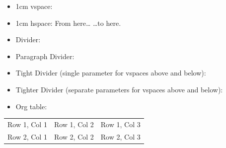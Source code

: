 \documentclass[10pt,letterpaper,ragged2e,withhyper]{altacv}
\begin{document}
\label{sec:orgaa14d8a}
\begin{itemize}
\item 1cm vspace:
\end{itemize}

\vspace{1cm}

\begin{itemize}
\item 1cm hspace: From here\ldots{} \hspace{1cm} \ldots{}to here.
\end{itemize}


\label{sec:orgd29cf89}
\begin{itemize}
\item Divider:
\end{itemize}
\divider

\begin{itemize}
\item Paragraph Divider:
\end{itemize}
\par\divider

\begin{itemize}
\item Tight Divider (single parameter for vspaces above and below):
\end{itemize}
\vspace{-1ex}\divider\vspace{-1ex}

\begin{itemize}
\item Tighter Divider (separate parameters for vspaces above and below):
\end{itemize}
\vspace{-2ex}\divider\vspace{1ex}


\label{sec:orga0a6f56}
\begin{itemize}
\item Org table:
\end{itemize}

\begin{center}
\begin{tabular}{lll}
\hline
Row 1, Col 1 & Row 1, Col 2 & Row 1, Col 3\\[0pt]
Row 2, Col 1 & Row 2, Col 2 & Row 2, Col 3\\[0pt]
\hline
\end{tabular}
\end{center}
\end{document}
